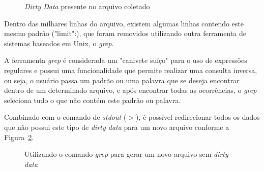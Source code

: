 \begin{figure}[h]
	\centering
	\caption{\textit{Dirty Data} presente no arquivo coletado}
	\vspace{-0.3cm}
	\label{fig-dirty}
\end{figure}

Dentro das milhares linhas do arquivo, existem algumas linhas contendo este mesmo padrão ("limit":), que foram removidos utilizando outra ferramenta de sistemas baseados em Unix, o \textit{grep}.

A ferramenta \textit{grep} é considerada um "canivete suíço" \space para o uso de expressões regulares e possui uma funcionalidade que permite realizar uma consulta inversa, ou seja, o usuário passa um padrão ou uma palavra que se deseja encontrar dentro de um determinado arquivo, e após encontrar todas as ocorrências, o \textit{grep} seleciona tudo o que não contém este padrão ou palavra.

Combinado com o comando de \textit{stdout} ($>$), é possível redirecionar todos os dados que não possui este tipo de \textit{dirty data} para um novo arquivo conforme a Figura~\ref{limpa-dado}.

\begin{figure}[h]
	\centering
	\caption{Utilizando o comando \textit{grep} para gerar um novo arquivo sem \textit{dirty data}}
	\vspace{-0.3cm}
	\label{limpa-dado}
\end{figure}

